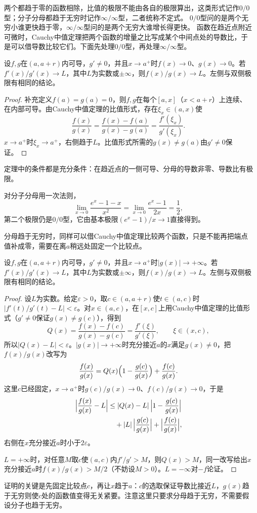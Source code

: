 两个都趋于零的函数相除，比值的极限不能由各自的极限算出，这类形式记作$0/0$型；分子分母都趋于无穷时记作$\infty/\infty$型，二者统称不定式。
$0/0$型问的是两个无穷小谁更快趋于零，$\infty/\infty$型问的是两个无穷大谁增长得更快。
函数在趋近点附近可微时，Cauchy中值定理把两个函数的增量之比写成某个中间点处的导数比，于是可以借导数比较它们。下面先处理$0/0$型，再处理$\infty/\infty$型。

\begin{theorem}
\label{thm:ru-lhopital}
设$f,g$在$(a,a+r)$内可导，$g'\neq0$，并且$x\to a^+$时$f(x)\to0$、$g(x)\to0$。若$f'(x)/g'(x)\to L$，其中$L$为实数或$\pm\infty$，则$f(x)/g(x)\to L$。左侧与双侧极限有相同的结论。
\end{theorem}
\begin{proof}
补充定义$f(a)=g(a)=0$，则$f,g$在每个$[a,x]$（$x<a+r$）上连续、在内部可导。由Cauchy中值定理的比值形式，存在$\xi_x\in(a,x)$使
\[
 \frac{f(x)}{g(x)}=\frac{f(x)-f(a)}{g(x)-g(a)}=\frac{f'(\xi_x)}{g'(\xi_x)}.
\]
$x\to a^+$时$\xi_x\to a^+$，右侧趋于$L$。比值形式所需的$g(x)\neq g(a)$由$g'\neq0$保证。
\end{proof}
定理中的条件都是充分条件：在趋近点的一侧可导、分母的导数非零、导数比有极限。
\begin{example}[一个$0/0$型极限]
\label{ex:ru-lhopital-exp}
对分子分母用一次法则，
\[
 \lim_{x\to0}\frac{e^x-1-x}{x^2}=\lim_{x\to0}\frac{e^x-1}{2x}=\frac12,
\]
第二个极限仍是$0/0$型，它由基本极限$(e^x-1)/x\to1$直接得到。
\end{example}
分母趋于无穷时，同样可以借Cauchy中值定理比较两个函数，只是不能再把端点值补成零，需要在离$a$稍远处固定一个比较点。
\begin{theorem}
\label{thm:ru-lhopital-infinity}
设$f,g$在$(a,a+r)$内可导，$g'\neq0$，并且$x\to a^+$时$|g(x)|\to+\infty$。若$f'(x)/g'(x)\to L$，其中$L$为实数或$\pm\infty$，则$f(x)/g(x)\to L$。左侧与双侧极限有相同的结论。
\end{theorem}
\begin{proof}
设$L$为实数。给定$\varepsilon>0$，取$c\in(a,a+r)$使$t\in(a,c)$时$|f'(t)/g'(t)-L|<\varepsilon$。对$x\in(a,c)$，在$[x,c]$上用Cauchy中值定理的比值形式（$g'\neq0$保证$g(x)\neq g(c)$），得到
\[
 Q(x)=\frac{f(x)-f(c)}{g(x)-g(c)}=\frac{f'(\xi)}{g'(\xi)},\qquad\xi\in(x,c),
\]
所以$|Q(x)-L|<\varepsilon$。$|g(x)|\to+\infty$时充分接近$a$的$x$满足$g(x)\neq0$，把$f(x)/g(x)$改写为
\[
 \frac{f(x)}{g(x)}=Q(x)\Bigl(1-\frac{g(c)}{g(x)}\Bigr)+\frac{f(c)}{g(x)}.
\]
这里$c$已经固定，$x\to a^+$时$g(c)/g(x)\to0$、$f(c)/g(x)\to0$，于是
\[
 \begin{aligned}
 \Bigl|\frac{f(x)}{g(x)}-L\Bigr|
 &\leq|Q(x)-L|\,\Bigl|1-\frac{g(c)}{g(x)}\Bigr|\\
 &\quad+|L|\,\Bigl|\frac{g(c)}{g(x)}\Bigr|+\Bigl|\frac{f(c)}{g(x)}\Bigr|,
 \end{aligned}
\]
右侧在$x$充分接近$a$时小于$2\varepsilon$。

$L=+\infty$时，对任意$M$取$c$使$(a,c)$内$f'/g'>M$，则$Q(x)>M$，同一改写给出$x$充分接近$a$时$f(x)/g(x)>M/2$（不妨设$M>0$）。$L=-\infty$对$-f$论证。
\end{proof}
证明的关键是先固定比较点$c$，再让$x$趋于$a$：$c$的选取保证导数比接近$L$，$g(x)$趋于无穷则使$c$处的函数值变得无关紧要。注意这里只要求分母趋于无穷，不需要假设分子也趋于无穷。

